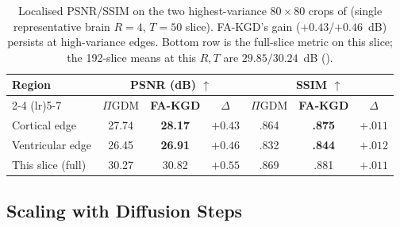 \documentclass[10pt,twocolumn,letterpaper]{article}
\begin{document}
\begin{table}[H]
\centering
\caption{Localised PSNR/SSIM on the two highest-variance $80{\times}80$
crops of  (single representative brain $R{=}4$,
$T{=}50$ slice). FA-KGD's gain ($+0.43$/$+0.46$~dB) persists at
high-variance edges. Bottom row is the full-slice metric on this
slice; the 192-slice means at this $R,T$ are $29.85/30.24$~dB
().}
\label{tab:crops}
\setlength{\tabcolsep}{2.8pt}
\scriptsize
\begin{tabular}{@{}l cc c cc c@{}}
\toprule
\multirow{2}{*}{Region} & \multicolumn{3}{c}{PSNR (dB) $\uparrow$} & \multicolumn{3}{c}{SSIM $\uparrow$} \\
\cmidrule(lr){2-4} \cmidrule(lr){5-7}
 & $\Pi$GDM & \textbf{FA-KGD} & $\Delta$ & $\Pi$GDM & \textbf{FA-KGD} & $\Delta$ \\
\midrule
Cortical edge    & 27.74 & \textbf{28.17} & $+0.43$ & .864 & \textbf{.875} & $+.011$ \\
Ventricular edge & 26.45 & \textbf{26.91} & $+0.46$ & .832 & \textbf{.844} & $+.012$ \\
\midrule
This slice (full) & 30.27 & 30.82 & $+0.55$ & .869 & .881 & $+.011$ \\
\bottomrule
\end{tabular}
\end{table}

\subsection{Scaling with Diffusion Steps}
\label{sec:tscaling}
\end{document}
